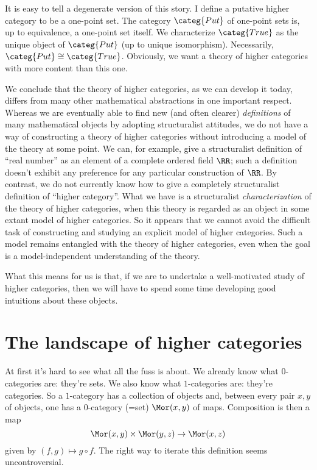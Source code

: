 It is easy to tell a degenerate version of this story.
I define a putative higher category to be a one-point set.
The category $\categ{Put}$ of one-point sets is, up to equivalence, a one-point set itself.
We characterize $\categ{True}$ as the unique object of $\categ{Put}$ (up to unique isomorphism).
Necessarily, $\categ{Put} \cong \categ{True}$.
Obviously, we want a theory of higher categories with more content than this one.

We conclude that the theory of higher categories, as we can develop it today, differs from many other mathematical abstractions in one important respect.
Whereas we are eventually able to find new (and often clearer) \emph{definitions} of many mathematical objects by adopting structuralist attitudes,
we do not have a way of constructing a theory of higher categories without introducing a model of the theory at some point.
We can, for example, give a structuralist definition of \enquote{real number} as an element of a complete ordered field $\RR$;
such a definition doesn't exhibit any preference for any particular construction of $\RR$.
By contrast, we do not currently know how to give a completely structuralist definition of \enquote{higher category}.
What we have is a structuralist \emph{characterization} of the theory of higher categories, when this theory is regarded as an object in some extant model of higher categories.
So it appears that we cannot avoid the difficult task of constructing and studying an explicit model of higher categories.
Such a model remains entangled with the theory of higher categories,
even when the goal is a model-independent understanding of the theory.

What this means for us is that, if we are to undertake a well-motivated study of higher categories, then we will have to spend some time developing good intuitions about these objects. 

\section*{The landscape of higher categories}%
\label{sec:landscape}

At first it's hard to see what all the fuss is about.
We already know what $0$-categories are: they're sets.
We also know what $1$-categories are: they're categories.
So a $1$-category has a collection of objects and, between every pair $x,y$ of objects, one has a $0$-category (=set) $\Mor(x,y)$ of maps.
Composition is then a map
\[
  \Mor(x,y) \times \Mor(y,z) \to \Mor(x,z)
\]
given by $(f,g) \mapsto g \circ f$.
The right way to iterate this definition seems uncontroversial.

